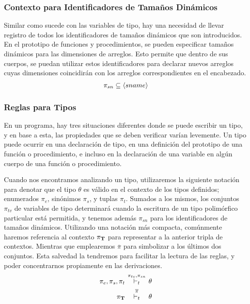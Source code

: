\subsubsection{Contexto para Identificadores de Tamaños Dinámicos}

Similar como sucede con las variables de tipo, hay una necesidad de llevar registro de todos los identificadores de tamaños dinámicos que son introducidos. %
En el prototipo de funciones y procedimientos, se pueden especificar tamaños dinámicos para las dimensiones de arreglos.
Esto permite que dentro de sus cuerpos, se puedan utilizar estos identificadores para declarar nuevos arreglos cuyas dimensiones coincidirán con los arreglos correspondientes en el encabezado. %
\begin{gather*}
\pi_{sn} \subseteq \langle sname \rangle
\end{gather*}

\subsubsection{Reglas para Tipos}

En un programa, hay tres situaciones diferentes donde se puede escribir un tipo, y
en base a esta, las propiedades que se deben verificar varían levemente.
Un tipo puede ocurrir en una declaración de tipo, en una definición del prototipo de una función o procedimiento, e incluso en la declaración de una variable en algún cuerpo de una función o procedimiento.

Cuando nos encontramos analizando un tipo, utilizaremos la siguiente notación para denotar que el tipo $\theta$ es válido en el contexto de los tipos definidos; enumerados $\pi_{e}$, sinónimos $\pi_{s}$, y tuplas $\pi_{t}$.
Sumados a los mismos, los conjuntos $\pi_{tv}$ de variables de tipo determinará cuando la escritura de un tipo polimórfico particular está permitida, y tenemos además $\pi_{sn}$ para los identificadores de tamaños dinámicos.
Utilizando una notación más compacta, comúnmente haremos referencia al contexto $\pi_{\mathbf{T}}$ para representar a la anterior tripla de contextos.
Mientras que emplearemos $\overline{\pi}$ para simbolizar a los últimos dos conjuntos.
Esta salvedad la tendremos para facilitar la lectura de las reglas, y poder concentrarnos propiamente en las derivaciones.
\begin{align*}
\pi_{e}, \pi_{s}, \pi_{t}
\quad
&\DASH[\mathclap{\pi_{tv}, \pi_{sn}}]{t}
\quad
\theta
\\
\PI{T}
\quad
&\DASH[\overline{\pi}]{t}
\quad
\theta
\end{align*}

